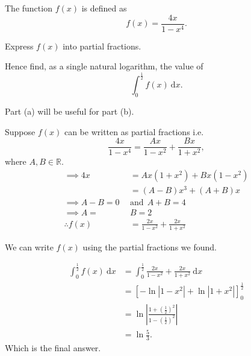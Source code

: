 \newq

\begin{question}
    The function \(f(x) \) is defined as \[ f(x) = \frac{4x}{1 - x^4}. \]

    \begin{questionparts}
        \item Express \(f(x) \) into partial fractions. 
        \item Hence find, as a single natural logarithm, the value of \[ \int_{0}^{\frac{1}{2}} f(x)~ \mathrm{d } x. \]
    \end{questionparts}
    
\end{question}

\begin{solution}
    Part (a) will be useful for part (b). 

    \begin{solutionparts}
        \item Suppose \(f(x) \) can be written as partial fractions i.e. 
        \[ \frac{4x}{1-x^4} = \frac{Ax }{1 -x^2} + \frac{Bx }{1 + x^2},  \] where \(A, B \in \mathbb{R }\). 
        \begin{align*}
            \implies 4x &= Ax(1+x^2) + Bx(1-x^2) \\
            &= (A-B)x^3 + (A+B)x \\
            \implies A - B = 0 ~~&\text{and}~~ A+B = 4 \\
            \implies A = ~&B = 2 \\
            \therefore f(x) &= \frac{2x}{1 - x^2} + \frac{2x}{1 + x^2}
        \end{align*}

        \item We can write \(f(x) \) using the partial fractions we found.
        
        \begin{align*}
            \int_{0}^{\frac{1}{2}} f(x) ~ \mathrm{d} x  &= \int_{0}^{\frac{1}{2}} \frac{2x}{1 - x^2} + \frac{2x}{1 + x^2} ~ \mathrm{d} x \\
            &= \left[ - \ln \left| 1 - x^2 \right| + \ln \left|1 + x^2 \right|\right]_0^\frac{1}{2} \\
            &= \ln \left| \frac{1+ \left(\frac{1}{2}\right)^2}{1 - \left(\frac{1}{2}\right)^2}\right| \\
            &= \ln \frac{5}{3}.
        \end{align*}
        Which is the final answer. 
    \end{solutionparts}
\end{solution}